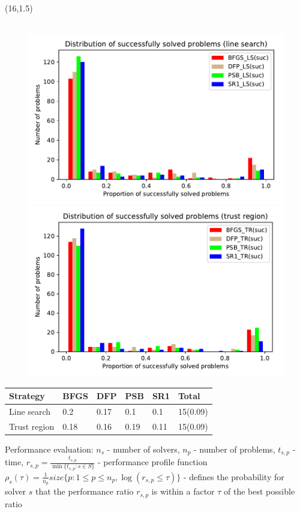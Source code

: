 \documentclass[a0]{a0poster}
\newcommand{\fr}{\frac}
\begin{document}
\begin{textblock}{7.0}(16,1.5)
		
\begin{figure}
	\
	\includegraphics[width=.55\textwidth]{pic/distr_line_search.pdf}
	\includegraphics[width=.55\textwidth]{pic/distr_trust_region.pdf}%
\end{figure}

\begin{flushleft}
	\begin{tabular}{ p{5cm} |p{3cm}| p{3cm}|p{3cm}|p{3cm}|p{3cm} }
		Strategy	& BFGS & DFP & PSB & SR1 & Total\\
		\hline
		Line search & 0.2&   0.17  &0.1&0.1&15(0.09)\\
		\hline
		Trust region&0.18&0.16& 0.19&0.11&15(0.09)
	\end{tabular}
\end{flushleft}

Performance evaluation:
$n_s$ - number of solvers, $n_p$ -  number of problems,
$t_{s,p}$ - time, $r_{s,p} = \fr{t_{s,p}}{\min\{t_{s,p}: s\in S\}}$ - performance profile function\\
$\rho_s(\tau) = \fr{1}{n_p}size\{p:1\le p\le n_p, \log(r_{s,p}\le \tau)\}$ - defines the probability for solver $s$ that the performance ratio $r_{s,p}$ is within a factor $\tau$ of the best possible ratio


\end{textblock}
\end{document}
